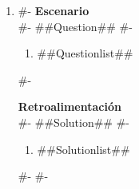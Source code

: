 \documentclass[10pt]{article}
\begin{document}
\twocolumn

\begin{enumerate}[label=\arabic*.]
#-
  \item
#-
  \textbf{Escenario}\\
#-
  ##Question##
#-
  \begin{enumerate}[label=(\alph*)]
    \item ##Questionlist##
  \end{enumerate}
#-

  \textbf{Retroalimentación}\\
#-
  ##Solution##
#-
  \begin{enumerate}[label=(\alph*)]
    \item ##Solutionlist##
  \end{enumerate}
#-
#-
\end{enumerate}
\end{document}
